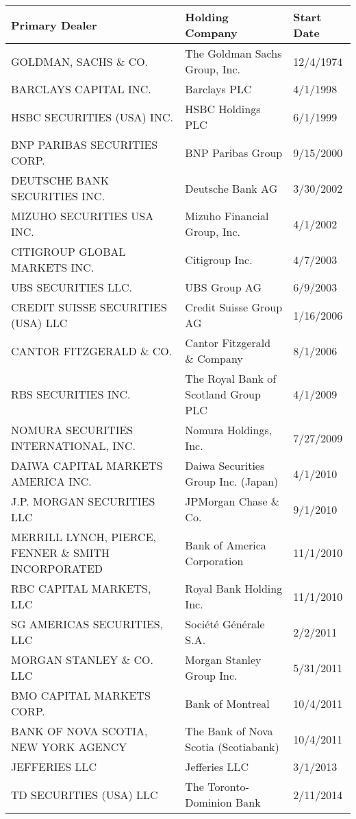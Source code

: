 \begin{tabular}{lll}
\toprule
Primary Dealer & Holding Company & Start Date \\
\midrule
GOLDMAN, SACHS \& CO.                & The Goldman Sachs Group, Inc. & 12/4/1974 \\
BARCLAYS CAPITAL INC.               & Barclays PLC & 4/1/1998 \\
HSBC SECURITIES (USA) INC.          & HSBC Holdings PLC & 6/1/1999 \\
BNP PARIBAS SECURITIES CORP.     & BNP Paribas Group & 9/15/2000 \\
DEUTSCHE BANK SECURITIES INC.    & Deutsche Bank AG & 3/30/2002 \\
MIZUHO SECURITIES USA INC.       & Mizuho Financial Group, Inc. & 4/1/2002 \\
CITIGROUP GLOBAL MARKETS INC.    & Citigroup Inc. & 4/7/2003 \\
UBS SECURITIES LLC.                 & UBS Group AG & 6/9/2003 \\
CREDIT SUISSE SECURITIES (USA) LLC     & Credit Suisse Group AG & 1/16/2006 \\
CANTOR FITZGERALD \& CO. & Cantor Fitzgerald \& Company & 8/1/2006 \\
RBS SECURITIES INC. & The Royal Bank of Scotland Group PLC & 4/1/2009 \\
NOMURA SECURITIES INTERNATIONAL, INC. & Nomura Holdings, Inc. & 7/27/2009 \\
DAIWA CAPITAL MARKETS AMERICA INC.   & Daiwa Securities Group Inc. (Japan) & 4/1/2010 \\
J.P. MORGAN SECURITIES LLC         & JPMorgan Chase \& Co. & 9/1/2010 \\
MERRILL LYNCH, PIERCE, FENNER \& SMITH INCORPORATED & Bank of America Corporation & 11/1/2010 \\
RBC CAPITAL MARKETS, LLC & Royal Bank Holding Inc. & 11/1/2010 \\
SG AMERICAS SECURITIES, LLC & Société Générale S.A. & 2/2/2011 \\
MORGAN STANLEY \& CO. LLC & Morgan Stanley Group Inc. & 5/31/2011 \\
BMO CAPITAL MARKETS CORP.  & Bank of Montreal & 10/4/2011 \\
BANK OF NOVA SCOTIA, NEW YORK AGENCY & The Bank of Nova Scotia (Scotiabank) & 10/4/2011 \\
JEFFERIES LLC & Jefferies LLC & 3/1/2013 \\
TD SECURITIES (USA) LLC & The Toronto-Dominion Bank & 2/11/2014 \\
\bottomrule
\end{tabular}
